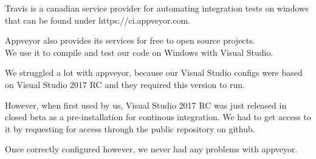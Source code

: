 Travis is a canadian service provider for automating integration tests on windows that can be found under https://ci.appveyor.com.

Appveyor also provides its services for free to open source projects. \cite{appveyorpricing} \\
We use it to compile and test our code on Windows with Visual Studio.

We struggled a lot with appveyor, because our Visual Studio configs were based on Visual Studio 2017 RC and they required this version to run.

However, when first used by us, Visual Studio 2017 RC was just released in closed beta as a pre-installation for continous integration. We had to get access to it by requesting for access through the public repository on github.

Once correctly configured however, we never had any problems with appveyor.